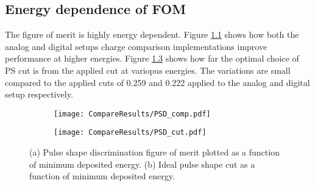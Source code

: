 \documentclass[main.tex]{subfiles}
\begin{document}
\begin{appendices}
\chapter{Energy dependence of FOM}\label{ch:appA}
The figure of merit is highly energy dependent. Figure \ref{fig:psd_fom_trend} shows how both the analog and digital setups charge comparison implementations improve performance at higher energies. Figure  \ref{fig:psd_cut_trend} shows how far the optimal choice of PS cut is from the applied cut at variopus energies. The variations are small compared to the applied cuts of 0.259 and 0.222 applied to the analog and digital setup respectively.
\begin{figure}[ht]
	\begin{subfigure}[b]{\textwidth}
	    \centering
    	\texttt{[image: CompareResults/PSD\_comp.pdf]}
        \caption{}
	    \label{fig:psd_fom_trend} 
	\end{subfigure}
	\begin{subfigure}[b]{\textwidth}
    	\centering
        \texttt{[image: CompareResults/PSD\_cut.pdf]}
        \caption{}
    	\label{fig:psd_cut_trend} 
    \end{subfigure}
    \caption[Energy dependence of PSD figure of merit.]{(a) Pulse shape discrimination figure of merit plotted as a function of minimum deposited energy. (b) Ideal pulse shape cut as a function of minimum deposited energy.}
\end{figure}


\end{appendices}
\end{document}
